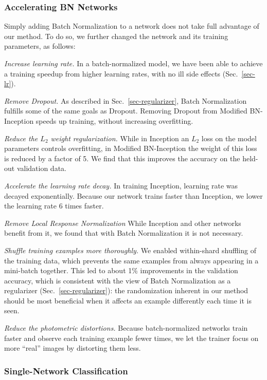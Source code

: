 \documentclass[twocolumn]{article}
\begin{document}
\subsubsection{Accelerating BN Networks}
\label{sec-accelerating}
Simply adding Batch Normalization to a network does not take full advantage of our method. To do so, we further changed the network and its training parameters, as follows:

{\em Increase learning rate.} In a batch-normalized model, we have been able to achieve a training speedup from higher learning rates, with no ill side effects (Sec.~\ref{sec-lr}).

 {\em Remove Dropout.} As described in Sec.~\ref{sec-regularizer}, Batch Normalization fulfills some of the same goals as Dropout. Removing Dropout from Modified BN-Inception speeds up training, without increasing overfitting. 
 
{\em Reduce the $L_2$ weight regularization.} While in Inception an $L_2$ loss on the model parameters controls overfitting, in Modified BN-Inception the weight of this loss is reduced by a factor of 5. We find that this improves the accuracy on the held-out validation data.

{\em Accelerate the learning rate decay.} In training Inception, learning rate was decayed exponentially. Because our network trains faster than Inception, we lower the learning rate  6 times faster.

{\em Remove Local Response Normalization}   While Inception and other networks \cite{dropout} benefit from it, we found that with Batch Normalization  it is not necessary.

{\em Shuffle training examples more thoroughly.} We enabled within-shard shuffling of the training data, which prevents the same examples from always appearing in a mini-batch together. This  led to about 1\% improvements in the validation accuracy, which is consistent with the view of Batch Normalization as a regularizer (Sec.~\ref{sec-regularizer}): the randomization inherent in our method should be most beneficial when it  affects an example differently each time it is seen.

{\em Reduce the photometric distortions.} Because batch-normalized networks train faster and observe each training example fewer times, we let the trainer focus on more ``real'' images by distorting them less.

\subsubsection{Single-Network Classification}
\end{document}
